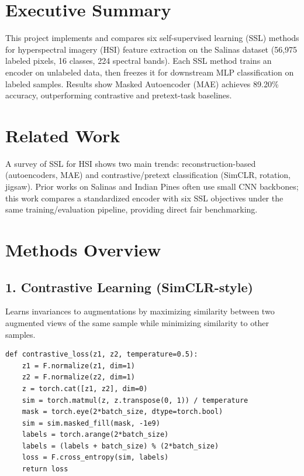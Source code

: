 \documentclass[11pt,a4paper]{article}
\begin{document}



\section{Executive Summary}

This project implements and compares six self-supervised learning (SSL) methods for hyperspectral imagery (HSI) feature extraction on the Salinas dataset (56,975 labeled pixels, 16 classes, 224 spectral bands). Each SSL method trains an encoder on unlabeled data, then freezes it for downstream MLP classification on labeled samples. Results show Masked Autoencoder (MAE) achieves 89.20\% accuracy, outperforming contrastive and pretext-task baselines.

\section{Related Work}

A survey of SSL for HSI shows two main trends: reconstruction-based (autoencoders, MAE) and contrastive/pretext classification (SimCLR, rotation, jigsaw). Prior works on Salinas and Indian Pines often use small CNN backbones; this work compares a standardized encoder with six SSL objectives under the same training/evaluation pipeline, providing direct fair benchmarking.

\section{Methods Overview}

\subsection{1. Contrastive Learning (SimCLR-style)}
Learns invariances to augmentations by maximizing similarity between two augmented views of the same sample while minimizing similarity to other samples.

\begin{lstlisting}
def contrastive_loss(z1, z2, temperature=0.5):
    z1 = F.normalize(z1, dim=1)
    z2 = F.normalize(z2, dim=1)
    z = torch.cat([z1, z2], dim=0)
    sim = torch.matmul(z, z.transpose(0, 1)) / temperature
    mask = torch.eye(2*batch_size, dtype=torch.bool)
    sim = sim.masked_fill(mask, -1e9)
    labels = torch.arange(2*batch_size)
    labels = (labels + batch_size) % (2*batch_size)
    loss = F.cross_entropy(sim, labels)
    return loss
\end{lstlisting}
\end{document}
